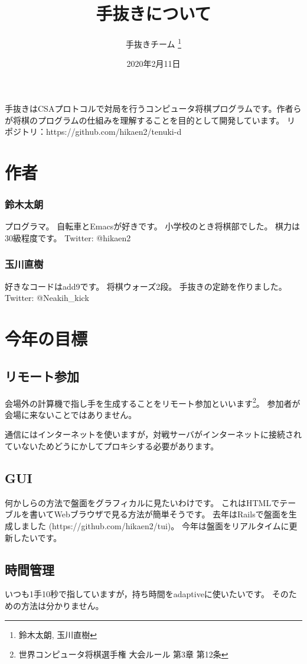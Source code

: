\documentclass[11pt,a4paper]{ltjsarticle}
\title{手抜きについて}
\author{手抜きチーム \thanks{鈴木太朗, 玉川直樹}}
\date{2020年2月11日}
\begin{document}
\maketitle

手抜きはCSAプロトコルで対局を行うコンピュータ将棋プログラムです。作者らが将棋のプログラムの仕組みを理解することを目的として開発しています。
リポジトリ：https://github.com/hikaen2/tenuki-d


\section{作者}

\subsubsection*{鈴木太朗}
プログラマ。
自転車とEmacsが好きです。
小学校のとき将棋部でした。
棋力は30級程度です。
Twitter: @hikaen2

\subsubsection*{玉川直樹}
好きなコードはadd9です。
将棋ウォーズ2段。
手抜きの定跡を作りました。
Twitter: @Neakih\_kick



\section{今年の目標}


\subsection{リモート参加}
会場外の計算機で指し手を生成することをリモート参加といいます\footnote{世界コンピュータ将棋選手権 大会ルール 第3章 第12条}。
参加者が会場に来ないことではありません。

通信にはインターネットを使いますが，対戦サーバがインターネットに接続されていないためどうにかしてプロキシする必要があります。


\subsection{GUI}
何かしらの方法で盤面をグラフィカルに見たいわけです。
これはHTMLでテーブルを書いてWebブラウザで見る方法が簡単そうです。
去年はRailsで盤面を生成しました (https://github.com/hikaen2/tui)。
今年は盤面をリアルタイムに更新したいです。

\subsection{時間管理}
いつも1手10秒で指していますが，持ち時間をadaptiveに使いたいです。
そのための方法は分かりません。
\end{document}
